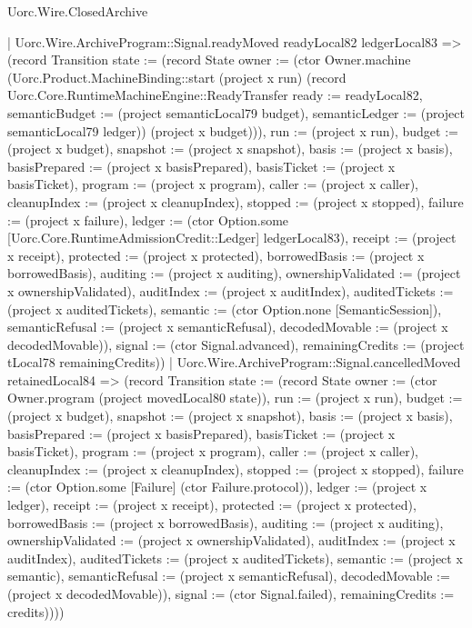 \begin{lexlean}{Uorc.Wire.ClosedArchive}
\begin{semanticmodule}
{        | Uorc.Wire.ArchiveProgram::Signal.readyMoved readyLocal82 ledgerLocal83 => (record Transition {state := (record State {owner := (ctor Owner.machine (Uorc.Product.MachineBinding::start (project x run) (record Uorc.Core.RuntimeMachineEngine::ReadyTransfer {ready := readyLocal82, semanticBudget := (project semanticLocal79 budget), semanticLedger := (project semanticLocal79 ledger)}) (project x budget))), run := (project x run), budget := (project x budget), snapshot := (project x snapshot), basis := (project x basis), basisPrepared := (project x basisPrepared), basisTicket := (project x basisTicket), program := (project x program), caller := (project x caller), cleanupIndex := (project x cleanupIndex), stopped := (project x stopped), failure := (project x failure), ledger := (ctor Option.some [Uorc.Core.RuntimeAdmissionCredit::Ledger] ledgerLocal83), receipt := (project x receipt), protected := (project x protected), borrowedBasis := (project x borrowedBasis), auditing := (project x auditing), ownershipValidated := (project x ownershipValidated), auditIndex := (project x auditIndex), auditedTickets := (project x auditedTickets), semantic := (ctor Option.none [SemanticSession]), semanticRefusal := (project x semanticRefusal), decodedMovable := (project x decodedMovable)}), signal := (ctor Signal.advanced), remainingCredits := (project tLocal78 remainingCredits)})
        | Uorc.Wire.ArchiveProgram::Signal.cancelledMoved retainedLocal84 => (record Transition {state := (record State {owner := (ctor Owner.program (project movedLocal80 state)), run := (project x run), budget := (project x budget), snapshot := (project x snapshot), basis := (project x basis), basisPrepared := (project x basisPrepared), basisTicket := (project x basisTicket), program := (project x program), caller := (project x caller), cleanupIndex := (project x cleanupIndex), stopped := (project x stopped), failure := (ctor Option.some [Failure] (ctor Failure.protocol)), ledger := (project x ledger), receipt := (project x receipt), protected := (project x protected), borrowedBasis := (project x borrowedBasis), auditing := (project x auditing), ownershipValidated := (project x ownershipValidated), auditIndex := (project x auditIndex), auditedTickets := (project x auditedTickets), semantic := (project x semantic), semanticRefusal := (project x semanticRefusal), decodedMovable := (project x decodedMovable)}), signal := (ctor Signal.failed), remainingCredits := credits}))))
}
\end{semanticmodule}
\end{lexlean}
